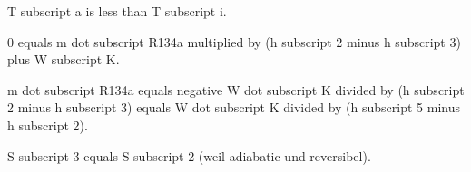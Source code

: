 T subscript a is less than T subscript i.  

0 equals m dot subscript R134a multiplied by (h subscript 2 minus h subscript 3) plus W subscript K.  

m dot subscript R134a equals negative W dot subscript K divided by (h subscript 2 minus h subscript 3) equals W dot subscript K divided by (h subscript 5 minus h subscript 2).  

S subscript 3 equals S subscript 2 (weil adiabatic und reversibel).